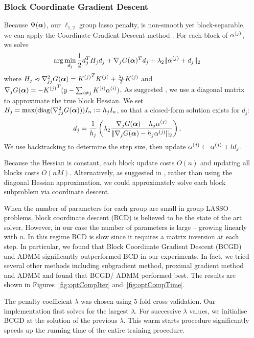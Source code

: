 \subsubsection*{Block Coordinate Gradient Descent}

Because $\Psi({\bm{\alpha}})$, our $\ell_{1,2}$ group lasso penalty, is non-smooth yet block-separable,
we can apply the Coordinate Gradient Descent method \citep{cgd:2009}.
For each block of ${\alpha^{(j)}}$, we solve
\[
\arg\min_{d_j} \frac{1}{2}d_j^T H_j d_j + \nabla_{j}G({\bm{\alpha}})^T d_j 
+ \lambda_2 \|{\alpha^{(j)}}+d_j\|_2
\]
where $H_j \approx \nabla^2_{jj}G({\bm{\alpha}}) = {K^{(j)}}^T {K^{(j)}} + \frac{\lambda_1}{2}{K^{(j)}}$ 
and $\nabla_j G({\bm{\alpha}}) = -{K^{(j)}}^T (y-\sum_{i\ne j}{{K^{(i)}} {\alpha^{(i)}}})$.
As suggested \citet{cgd:2009}, we use a diagonal matrix to approximate the true block Hessian.
We set $H_j = \max({\rm diag}(\nabla^2_{jj}G({\bm{\alpha}}))) I_n := h_j I_n$, so that a closed-form solution exists
for $d_j$:
\[
d_j = \frac{1}{h_j}\left(\lambda_2 \frac{\nabla_j G({\bm{\alpha}}) - h_j {\alpha^{(j)}}}
{\|\nabla_j G({\bm{\alpha}}) - h_j {\alpha^{(j)}}\|_2}\right).
\]
We use backtracking to determine the step size, then update ${\alpha^{(j)}} \leftarrow {\alpha^{(j)}} + t d_j$.

Because the Hessian is constant, each block update costs $O(n)$ and updating all blocks costs $O(nM)$.
Alternatively, as suggested in \citet{note-group-lasso:2010}, rather than using the 
diagonal Hessian approximation, we could approximately solve each block subproblem via 
coordinate descent.


When the number of parameters for each group are small in group LASSO problems, 
block coordinate descent (BCD) is believed
to be the state of the art solver. However, in our case the number of parameters
is large -- growing linearly with $n$. In this regime BCD is slow since it
requires a matrix inversion at each step. In particular, we found that Block
Coordinate Gradient Descent (BCGD) and ADMM significantly outperformed BCD in our
experiments. 
In fact, we tried several other methods including subgradient method, proximal
gradient method and ADMM and found that BCGD/ ADMM performed best.
The results are shown in Figures~\ref{fig:optCompIter} and~\ref{fig:optCompTime}.

\insertFigOpt

The penalty coefficient $\lambda$ was chosen using $5$-fold cross validation. 
Our implementation
first solves for the largest $\lambda$. For successive $\lambda$
values, we initialise BCGD at the solution of the previous $\lambda$. This
warm starts procedure significantly speeds up the running time of the entire
training procedure.


